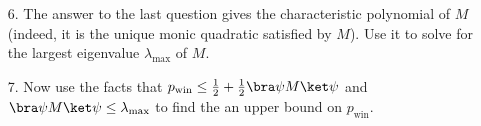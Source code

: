 \begin{exercises}
\begin{enumerate}
\item[6.] The answer to the last question gives the characteristic polynomial of $M$ (indeed, it is the unique monic quadratic satisfied by $M$). Use it to solve for the largest eigenvalue $\lambda_\text{max}$ of $M$.
\item[7.] Now use the facts that $p_{\text{win}} \leq \frac 12 + \frac12 \bra\psi M \ket \psi$ and $\bra\psi M \ket \psi \leq \lambda_\text{max}$ to find the an upper bound on $p_\text{win}$.
\end{enumerate}

\end{exercises}
